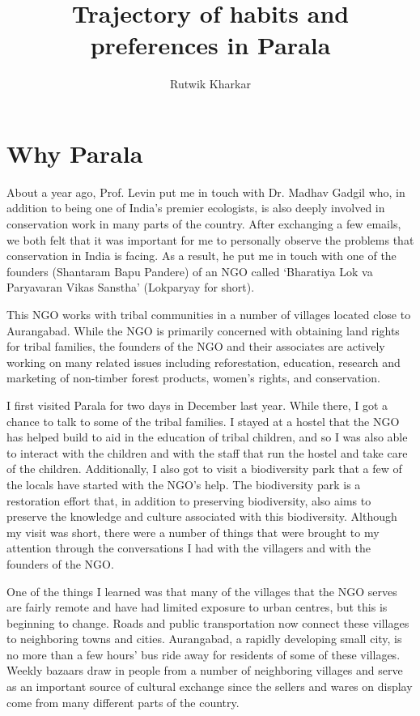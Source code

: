 \documentclass{article}
\title{Trajectory of habits and preferences in Parala}
\author{Rutwik Kharkar}
\begin{document}
\maketitle

\section{Why Parala}

About a year ago, Prof. Levin put me in touch with Dr. Madhav Gadgil who, in addition to being one of India's premier ecologists, is also deeply involved in conservation work in many parts of the country. After exchanging a few emails, we both felt that it was important for me to personally observe the problems that conservation in India is facing. As a result, he put me in touch with one of the founders (Shantaram Bapu Pandere) of an NGO called `Bharatiya Lok va Paryavaran Vikas Sanstha' (Lokparyay for short).

This NGO works with tribal communities in a number of villages located close to Aurangabad. While the NGO is primarily concerned with obtaining land rights for tribal families, the founders of the NGO and their associates are actively working on many related issues including reforestation, education, research and marketing of non-timber forest products, women's rights, and conservation.

I first visited Parala for two days in December last year. While there, I got a chance to talk to some of the tribal families. I stayed at a hostel that the NGO has helped build to aid in the education of tribal children, and so I was also able to interact with the children and with the staff that run the hostel and take care of the children. Additionally, I also got to visit a biodiversity park that a few of the locals have started with the NGO's help. The biodiversity park is a restoration effort that, in addition to preserving biodiversity, also aims to preserve the knowledge and culture associated with this biodiversity. Although my visit was short, there were a number of things that were brought to my attention through the conversations I had with the villagers and with the founders of the NGO.

One of the things I learned was that many of the villages that the NGO serves are fairly remote and have had limited exposure to urban centres, but this is beginning to change. Roads and public transportation now connect these villages to neighboring towns and cities. Aurangabad, a rapidly developing small city, is no more than a few hours' bus ride away for residents of some of these villages. Weekly bazaars draw in people from a number of neighboring villages and serve as an important source of cultural exchange since the sellers and wares on display come from many different parts of the country.
\end{document}
